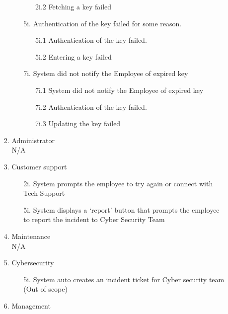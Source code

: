 \documentclass[]{article}
\begin{document}
\begin{enumerate}[{\bf BE1.}]
\begin{enumerate}[{\bf BE9.}]
\begin{enumerate}[{\bf VP1.}]
\begin{enumerate}
\begin{enumerate}
                        \item[2i.2] Fetching a key failed
                    \end{enumerate}
                    \item[5i.]  Authentication of the key failed for some reason.  
                    \begin{enumerate}
                        \item[5i.1] Authentication of the key failed.
                        \item[5i.2] Entering a key failed
                    \end{enumerate}
		    \item[7i.]  System did not notify the Employee of expired key
                    \begin{enumerate}
                        \item[7i.1] System did not notify the Employee of expired key
                        \item[7i.2] Authentication of the key failed.
			\item[7i.3] Updating the key failed
                    \end{enumerate}
                \end{enumerate}
		  \item Administrator \\
			N/A
            \item Customer support \\
	           \begin{enumerate}
                        \item[2i.] System prompts the employee to try again or connect with Tech Support
                        \item[5i.] System displays a ‘report’ button that prompts the employee to report the incident to Cyber Security Team 
                    \end{enumerate}
            \item Maintenance \\
	            N/A
            \item Cybersecurity \\
            	\begin{enumerate}
                        \item[5i.] System auto creates an incident ticket for Cyber security team (Out of scope)
                \end{enumerate}
            \item Management \\

\end{enumerate}
\end{enumerate}
\end{enumerate}
\end{document}
